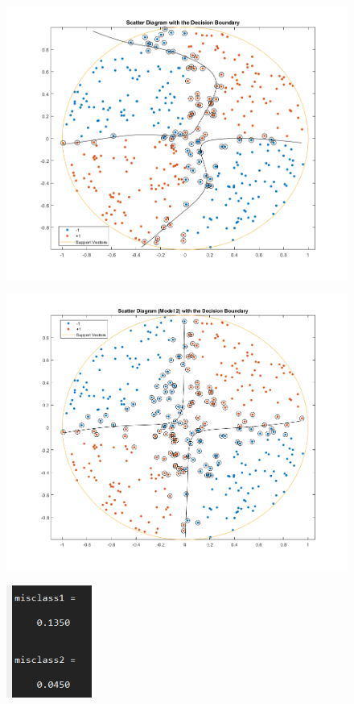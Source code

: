 \documentclass[11pt]{article}
\begin{document}
\begin{figure}[!h]
  \centering
  \includegraphics[width=1.0\textwidth]{../q2/scatter_dbound.png}
  \label{fig:scatter_gamma1}
\end{figure}


\begin{figure}[!h]
  \centering
  \includegraphics[width=1.0\textwidth]{../q2/scatter_dbound_model2.png}
  \label{fig:scatter_gamma05}
\end{figure}


\begin{figure}[!h]
  \centering
  \includegraphics[width=0.25\textwidth]{../q2/misclass_rates.png}
  \label{fig:misclassrates}
\end{figure}
\end{document}
